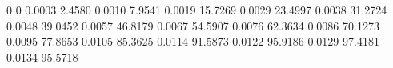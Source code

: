 0	0
0.0003	2.4580
0.0010	7.9541
0.0019	15.7269
0.0029	23.4997
0.0038	31.2724
0.0048	39.0452
0.0057	46.8179
0.0067	54.5907
0.0076	62.3634
0.0086	70.1273
0.0095	77.8653
0.0105	85.3625
0.0114	91.5873
0.0122	95.9186
0.0129	97.4181
0.0134	95.5718

